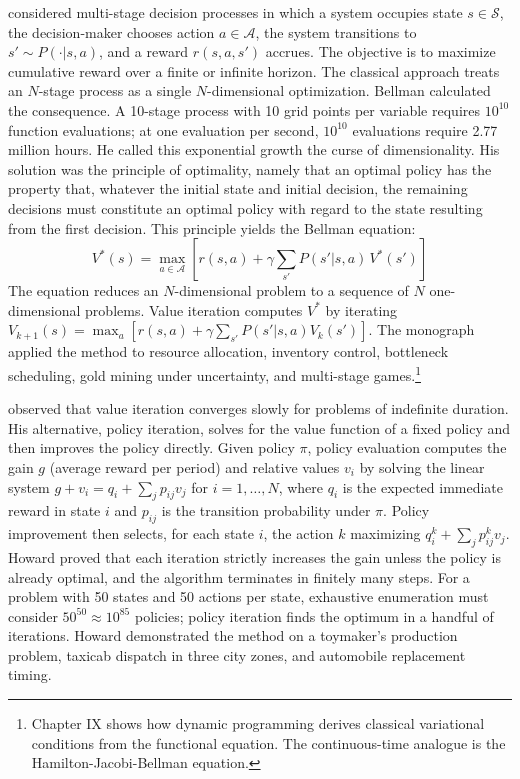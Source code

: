 \citet{Bellman1957} considered multi-stage decision processes in which a system occupies state $s \in \mathcal{S}$, the decision-maker chooses action $a \in \mathcal{A}$, the system transitions to $s' \sim P(\cdot|s,a)$, and a reward $r(s,a,s')$ accrues. The objective is to maximize cumulative reward over a finite or infinite horizon. The classical approach treats an $N$-stage process as a single $N$-dimensional optimization. Bellman calculated the consequence. A 10-stage process with 10 grid points per variable requires $10^{10}$ function evaluations; at one evaluation per second, $10^{10}$ evaluations require 2.77 million hours. He called this exponential growth the curse of dimensionality. His solution was the principle of optimality, namely that an optimal policy has the property that, whatever the initial state and initial decision, the remaining decisions must constitute an optimal policy with regard to the state resulting from the first decision. This principle yields the Bellman equation:
\begin{equation}
V^*(s) = \max_{a \in \mathcal{A}} \left[ r(s,a) + \gamma \sum_{s'} P(s'|s,a) \, V^*(s') \right]
\label{eq:bellman}
\end{equation}
The equation reduces an $N$-dimensional problem to a sequence of $N$ one-dimensional problems. Value iteration computes $V^*$ by iterating $V_{k+1}(s) = \max_a [r(s,a) + \gamma \sum_{s'} P(s'|s,a) V_k(s')]$. The monograph applied the method to resource allocation, inventory control, bottleneck scheduling, gold mining under uncertainty, and multi-stage games.\footnote{Chapter IX shows how dynamic programming derives classical variational conditions from the functional equation. The continuous-time analogue is the Hamilton-Jacobi-Bellman equation.}

\citet{howard1960} observed that value iteration converges slowly for problems of indefinite duration. His alternative, policy iteration, solves for the value function of a fixed policy and then improves the policy directly. Given policy $\pi$, policy evaluation computes the gain $g$ (average reward per period) and relative values $v_i$ by solving the linear system $g + v_i = q_i + \sum_j p_{ij} v_j$ for $i = 1, \ldots, N$, where $q_i$ is the expected immediate reward in state $i$ and $p_{ij}$ is the transition probability under $\pi$. Policy improvement then selects, for each state $i$, the action $k$ maximizing $q_i^k + \sum_j p_{ij}^k v_j$. Howard proved that each iteration strictly increases the gain unless the policy is already optimal, and the algorithm terminates in finitely many steps. For a problem with 50 states and 50 actions per state, exhaustive enumeration must consider $50^{50} \approx 10^{85}$ policies; policy iteration finds the optimum in a handful of iterations. Howard demonstrated the method on a toymaker's production problem, taxicab dispatch in three city zones, and automobile replacement timing.

